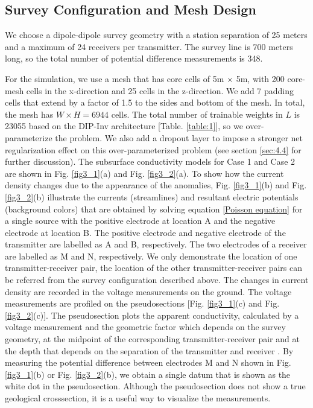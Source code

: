 \documentclass[lettersize,journal]{IEEEtran}
\begin{document}
\subsection{Survey Configuration and Mesh Design}
\label{sec:3.1}
We choose a dipole-dipole survey geometry with a station separation of 25 meters and a maximum of 24 receivers per transmitter. The survey line is 700 meters long, so the total number of potential difference measurements is 348. 

For the simulation, we use a mesh that has core cells of 5m $\times$ 5m, with 200 core-mesh cells in the x-direction and 25 cells in the z-direction. We add 7 padding cells that extend by a factor of 1.5 to the sides and bottom of the mesh. In total, the mesh has $W\times H = 6944$ cells. The total number of trainable weights in $L$ is 23055 based on the DIP-Inv architecture [Table. \ref{table:1}], so we over-parameterize the problem. We also add a dropout layer to impose a stronger net regularization effect on this over-parameterized problem (see section \ref{sec:4.4} for further discussion). The subsurface conductivity models for Case 1 and Case 2 are shown in Fig. \ref{fig3_1}(a) and Fig. \ref{fig3_2}(a). To show how the current density changes due to the appearance of the anomalies, Fig. \ref{fig3_1}(b) and Fig. \ref{fig3_2}(b) illustrate the currents (streamlines) and resultant electric potentials (background colors) that are obtained by solving equation \ref{Poisson equation} for a single source with the positive electrode at location A and the negative electrode at location B. The positive electrode and negative electrode of the transmitter are labelled as A and B, respectively. The two electrodes of a receiver are labelled as M and N, respectively. We only demonstrate the location of one transmitter-receiver pair, the location of the other transmitter-receiver pairs can be referred from the survey configuration described above. The changes in current density are recorded in the voltage measurements on the ground. The voltage measurements are profiled on the pseudosections [Fig. \ref{fig3_1}(c) and Fig. \ref{fig3_2}(c)]. The pseudosection plots the apparent conductivity, calculated by a voltage measurement and the geometric factor which depends on the survey geometry, at the midpoint of the corresponding transmitter-receiver pair and at the depth that depends on the separation of the transmitter and receiver \cite{ref36}. By measuring the potential difference between electrodes M and N shown in Fig. \ref{fig3_1}(b) or Fig. \ref{fig3_2}(b), we obtain a single datum that is shown as the white dot in the pseudosection. Although the pseudosection does not show a true geological crosssection, it is a useful way to visualize the measurements. 
\end{document}
